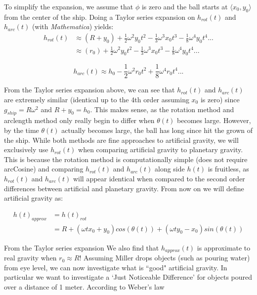 \documentclass{amsart}
\theoremstyle{definition}
\begin{document}
To simplify the expansion, we assume that  $\phi$ is zero and the ball starts at $\langle x_0,y_0\rangle$ from the center of the ship. Doing a Taylor series expansion on $h_{rot}(t)$ and $h_{arc}(t)$ (with \textsl{Mathematica}) yields:
\begin{equation}
\begin{split}
     h_{rot}(t) &\approx (R+y_0)+\frac{1}{2}\omega^2 y_0 t^2 - \frac{1}{3}\omega^3 x_0 t^3 -\frac{1}{8}\omega^4 y_0 t^4... \\
     &\approx (r_0)+\frac{1}{2}\omega^2 y_0 t^2 - \frac{1}{3}\omega^3 x_0 t^3 -\frac{1}{8}\omega^4 y_0 t^4...
\end{split}
\end{equation}

\begin{equation}
 h_{arc}(t) \approx h_0 -\frac{1}{2}\omega^2 r_0 t^2 + \frac{1}{8}\omega^4 r_0 t^4 ...
\end{equation}

From the Taylor series expansion above, we can see that $h_{rot}(t)$
and $h_{arc}(t)$ are extremely similar (identical up to the 4th order
assuming $x_0$ is zero) since $g_{ship} = R \omega^2$ and $R+y_0 =
h_0$. This makes sense, as the rotation method and arclength method
only really begin to differ when $\theta(t)$ becomes large. However,
by the time $\theta(t)$ actually becomes large, the ball has long
since hit the grown of the ship. While both methods are fine
approaches to artificial gravity, we will exclusively use $h_{rot}(t)$
when comparing artificial gravity to planetary gravity. This is
because the rotation method is computationally simple (does not
require arcCosine) and comparing $h_{rot}(t)$ and $h_{arc}(t)$ along
side $h(t)$ is fruitless, as $h_{rot}(t)$ and $h_{arc}(t)$ will appear
identical when compared to the second order differences between
artificial and planetary gravity. From now on we will define
artificial gravity as:

\begin{equation}\label{eq:approxGravHeight}
\begin{split}
    h(t)_{approx} &= h(t)_{rot} \\
    &=R+(\omega t x_0 + y_0)cos(\theta(t))+(\omega t y_0 - x_0)sin(\theta (t))
\end{split}
\end{equation}

From the Taylor series expansion We also find that $h_{approx}(t)$ is approximate to real gravity when $r_0 \approx R$! Assuming Miller drops objects (such as pouring water) from eye level, we can now investigate what is ``good" artificial gravity. In particular we want to investigate a `Just Noticeable Difference' for objects poured over a distance of 1 meter. According to Weber's law
\end{document}
